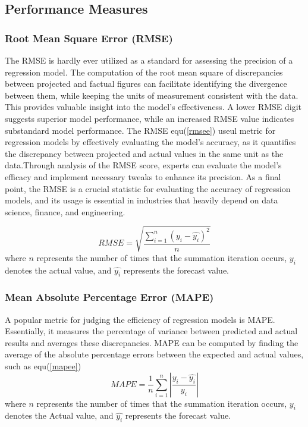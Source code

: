 \documentclass[a4paper,fleqn]{cas-dc}
\begin{document}
\subsection{ Performance Measures}
\subsubsection{Root Mean Square Error (RMSE) }
The RMSE is hardly ever utilized as a standard for assessing the precision of a regression model. The computation of the root mean square of discrepancies between projected and factual figures can facilitate identifying the divergence between them, while keeping the units of measurement consistent with the data. This provides valuable insight into the model's effectiveness. A lower RMSE digit suggests superior model performance, while an increased RMSE value indicates substandard model performance. The RMSE equ(\ref{rmsee}) useul metric for regression models by effectively evaluating the model's accuracy, as it quantifies the discrepancy between projected and actual values in the same unit as the data.Through analysis of the RMSE score, experts can evaluate the model's efficacy and implement necessary tweaks to enhance its precision. As a final point, the RMSE is a crucial statistic for evaluating the accuracy of regression models, and its usage is essential in industries that heavily depend on data science, finance, and engineering.



\begin{equation} \label{rmsee}
RMSE=\sqrt{\frac{\sum_{i=1}^{n}(y_{i}-\hat{y_{i}})^2}{n}}
\end{equation}
where $n$ represents the number of times that the summation iteration occurs, \begin{math} y_{i} \end{math} denotes the actual value, and \begin{math}\hat{y_{i}}\end{math} represents the forecast value.




\subsubsection{ Mean Absolute Percentage Error (MAPE)}
A popular metric for judging the efficiency of regression models is MAPE. Essentially, it measures the percentage of variance between predicted and actual results and averages these discrepancies. MAPE can be computed by finding the average of the absolute percentage errors between the expected and actual values, such as equ(\ref{mapee})
\begin{equation} \label{mapee}
MAPE=\frac{1}{n}\sum_{i=1}^{n} \left | \frac{y_{i}-\hat{y_{i}}}{y_{i}} \right |
\end{equation}
where $n$ represents the number of times that the summation iteration occurs, \begin{math} y_{i} \end{math} denotes the Actual value, and \begin{math}\hat{y_{i}}\end{math} represents the forecast value.
\end{document}
